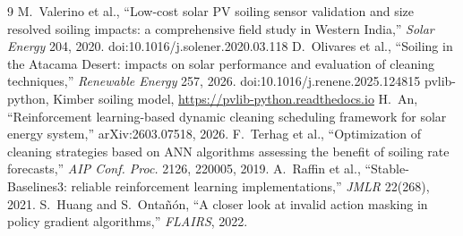 \documentclass[10pt,twocolumn]{article}
\begin{document}
\footnotesize
\begin{thebibliography}{9}\setlength{\itemsep}{0pt}
 M.~Valerino et al., ``Low-cost solar PV soiling sensor validation and size resolved soiling impacts: a comprehensive field study in Western India,'' \emph{Solar Energy} 204, 2020. doi:10.1016/j.solener.2020.03.118
 D.~Olivares et al., ``Soiling in the Atacama Desert: impacts on solar performance and evaluation of cleaning techniques,'' \emph{Renewable Energy} 257, 2026. doi:10.1016/j.renene.2025.124815
 pvlib-python, Kimber soiling model, \url{https://pvlib-python.readthedocs.io}
 H.~An, ``Reinforcement learning-based dynamic cleaning scheduling framework for solar energy system,'' arXiv:2603.07518, 2026.
 F.~Terhag et al., ``Optimization of cleaning strategies based on ANN algorithms assessing the benefit of soiling rate forecasts,'' \emph{AIP Conf. Proc.} 2126, 220005, 2019.
 A.~Raffin et al., ``Stable-Baselines3: reliable reinforcement learning implementations,'' \emph{JMLR} 22(268), 2021.
 S.~Huang and S.~Onta\~n\'on, ``A closer look at invalid action masking in policy gradient algorithms,'' \emph{FLAIRS}, 2022.
\end{thebibliography}
\end{document}
